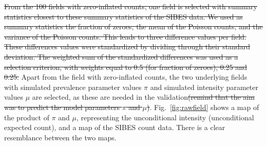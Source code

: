 \documentclass[review]{elsarticle}
\providecommand{\DIFdel}[1]{{\protect\color{red}\sout{#1}}}                      %
\providecommand{\DIFdelbegin}{} %
\providecommand{\DIFdelend}{} %
\begin{document}
\begin{enumerate}
\DIFdelbegin %
\DIFdel{From the 100 fields with zero-inflated counts, one field is selected with summary statistics closest to these summary statistics of the SIBES data. We used as summary statistics the fraction of zeroes, the mean of the Poisson counts, and the variance of the Poisson counts. This leads to three difference values per field. These differences values were standardized by dividing through their standard deviation. The weighted sum of the standardized differences was used as a selection criterion, with weights equal to 0.5 (for fraction of zeroes), 0.25 and 0.25. }\DIFdelend Apart from the field with zero-inflated counts, the two underlying fields with simulated prevalence parameter values $\pi$ and simulated intensity parameter values $\mu$ are selected, as these are needed in the validation\DIFdelbegin \DIFdel{(remind that the aim was to predict the model parameters $\pi$ and $\mu$)}\DIFdelend . Fig.~\ref{fig:rawfield} shows a map of the product of $\pi$ and $\mu$, representing the unconditional intensity (unconditional expected count), and a map of the SIBES count data. There is a clear resemblance between the two maps.


\end{enumerate}
\end{document}
